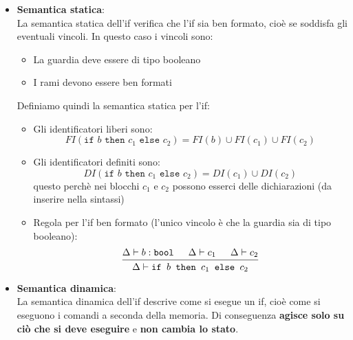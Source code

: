 \documentclass[a4paper]{article}
\begin{document}
\begin{itemize}
  \item \textbf{Semantica statica}: \\
    La semantica statica dell'if verifica che l'if sia ben formato, cioè se soddisfa gli
    eventuali vincoli. In questo caso i vincoli sono:
    \begin{itemize}
      \item La guardia deve essere di tipo booleano
      \item I rami devono essere ben formati
    \end{itemize}
    Definiamo quindi la semantica statica per l'if:
    \begin{itemize}
      \item Gli identificatori liberi sono:
        \[
          FI(\texttt{if } b \texttt{ then } c_1 \texttt{ else } c_2) =
          FI(b) \cup FI(c_1) \cup FI(c_2)
        \]

      \item Gli identificatori definiti sono:
        \[
          DI(\texttt{if } b \texttt{ then } c_1 \texttt{ else } c_2) =
          DI(c_1) \cup DI(c_2)
        \]
        questo perchè nei blocchi \( c_1 \) e \( c_2 \) possono esserci delle dichiarazioni
        (da inserire nella sintassi)

      \item Regola per l'if ben formato (l'unico vincolo è che la guardia sia di tipo booleano):
        \[
          \begin{prooftree}
            \hypo{ 
              \Delta \vdash b : \texttt{bool} 
            }
            \hypo{ 
              \Delta \vdash c_1
            }
            \hypo{ 
              \Delta \vdash c_2
            }
            \infer3{ 
              \Delta \vdash \texttt{if } b \texttt{ then } c_1 \texttt{ else } c_2
            }
          \end{prooftree}
        \] 
    \end{itemize}

  \item \textbf{Semantica dinamica}: \\
    La semantica dinamica dell'if descrive come si esegue un if, cioè come si eseguono
    i comandi a seconda della memoria. Di conseguenza \textbf{agisce solo su ciò che
    si deve eseguire} e \textbf{non cambia lo stato}.


\end{itemize}
\end{document}
